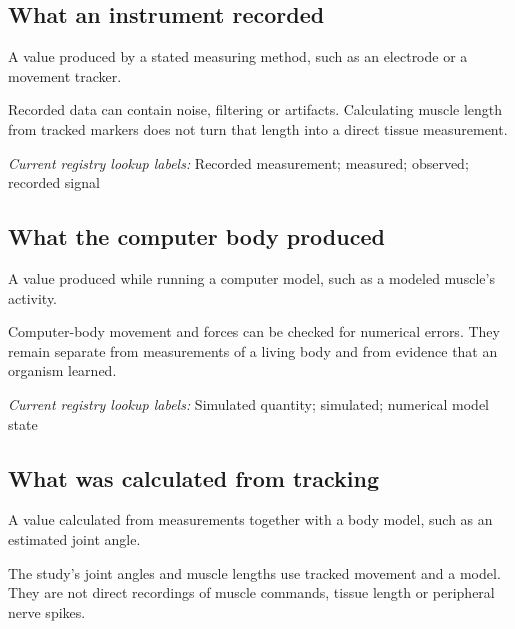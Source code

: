 \begin{samepage}
\subsection*{What an instrument recorded}
\noindent A value produced by a stated measuring method, such as an electrode or a movement tracker.\par
\end{samepage}
\begin{samepage}
\noindent Recorded data can contain noise, filtering or artifacts. Calculating muscle length from tracked markers does not turn that length into a direct tissue measurement.\par\nopagebreak[4]

\end{samepage}


\noindent\textit{Current registry lookup labels:} Recorded measurement; measured; observed; recorded signal\par

\begin{samepage}
\subsection*{What the computer body produced}
\noindent A value produced while running a computer model, such as a modeled muscle’s activity.\par
\end{samepage}
\begin{samepage}
\noindent Computer-body movement and forces can be checked for numerical errors. They remain separate from measurements of a living body and from evidence that an organism learned.\par\nopagebreak[4]

\end{samepage}


\noindent\textit{Current registry lookup labels:} Simulated quantity; simulated; numerical model state\par

\begin{samepage}
\subsection*{What was calculated from tracking}
\noindent A value calculated from measurements together with a body model, such as an estimated joint angle.\par
\end{samepage}
\begin{samepage}
\noindent The study’s joint angles and muscle lengths use tracked movement and a model. They are not direct recordings of muscle commands, tissue length or peripheral nerve spikes.\par\nopagebreak[4]

\end{samepage}


